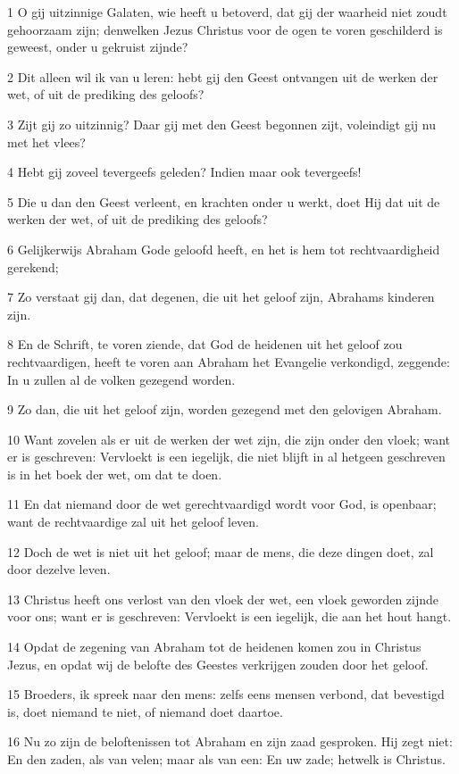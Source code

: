 \par 1 O gij uitzinnige Galaten, wie heeft u betoverd, dat gij der waarheid niet zoudt gehoorzaam zijn; denwelken Jezus Christus voor de ogen te voren geschilderd is geweest, onder u gekruist zijnde?
\par 2 Dit alleen wil ik van u leren: hebt gij den Geest ontvangen uit de werken der wet, of uit de prediking des geloofs?
\par 3 Zijt gij zo uitzinnig? Daar gij met den Geest begonnen zijt, voleindigt gij nu met het vlees?
\par 4 Hebt gij zoveel tevergeefs geleden? Indien maar ook tevergeefs!
\par 5 Die u dan den Geest verleent, en krachten onder u werkt, doet Hij dat uit de werken der wet, of uit de prediking des geloofs?
\par 6 Gelijkerwijs Abraham Gode geloofd heeft, en het is hem tot rechtvaardigheid gerekend;
\par 7 Zo verstaat gij dan, dat degenen, die uit het geloof zijn, Abrahams kinderen zijn.
\par 8 En de Schrift, te voren ziende, dat God de heidenen uit het geloof zou rechtvaardigen, heeft te voren aan Abraham het Evangelie verkondigd, zeggende: In u zullen al de volken gezegend worden.
\par 9 Zo dan, die uit het geloof zijn, worden gezegend met den gelovigen Abraham.
\par 10 Want zovelen als er uit de werken der wet zijn, die zijn onder den vloek; want er is geschreven: Vervloekt is een iegelijk, die niet blijft in al hetgeen geschreven is in het boek der wet, om dat te doen.
\par 11 En dat niemand door de wet gerechtvaardigd wordt voor God, is openbaar; want de rechtvaardige zal uit het geloof leven.
\par 12 Doch de wet is niet uit het geloof; maar de mens, die deze dingen doet, zal door dezelve leven.
\par 13 Christus heeft ons verlost van den vloek der wet, een vloek geworden zijnde voor ons; want er is geschreven: Vervloekt is een iegelijk, die aan het hout hangt.
\par 14 Opdat de zegening van Abraham tot de heidenen komen zou in Christus Jezus, en opdat wij de belofte des Geestes verkrijgen zouden door het geloof.
\par 15 Broeders, ik spreek naar den mens: zelfs eens mensen verbond, dat bevestigd is, doet niemand te niet, of niemand doet daartoe.
\par 16 Nu zo zijn de beloftenissen tot Abraham en zijn zaad gesproken. Hij zegt niet: En den zaden, als van velen; maar als van een: En uw zade; hetwelk is Christus.
